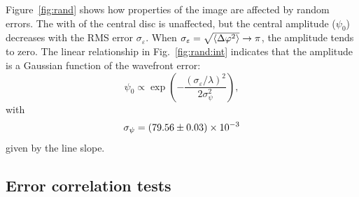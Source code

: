 \documentclass[11pt]{article}
\newcommand{\eps}{\varepsilon}
\newcommand{\ph}{\varphi}
\begin{document}
Figure~\ref{fig:rand} shows how properties of the image are affected by random errors. The with of the central disc is unaffected, but the central amplitude ($\psi_0$) decreases with the RMS error $\sigma_\eps$. When $\sigma_\eps = \sqrt{\expval{\Delta\ph^2}} \rightarrow \pi$, the amplitude tends to zero. The linear relationship in Fig.~\ref{fig:rand:int} indicates that the amplitude is a Gaussian function of the wavefront error:
\begin{equation}
    \psi_0 \propto \exp \left( - \frac{(\sigma_\eps / \lambda)^2}{2 \sigma_\psi^2} \right),
\end{equation}
with
\begin{equation}
    \sigma_\psi = \num{79.56 \pm 0.03 e-3}
\end{equation}
given by the line slope.

\subsection{Error correlation tests}\label{sec:res:rms}
\end{document}
